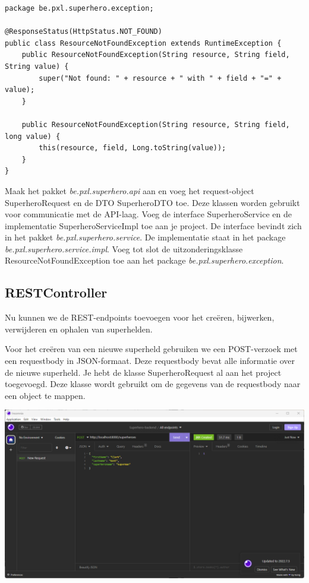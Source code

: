 \begin{lstlisting}
package be.pxl.superhero.exception;

@ResponseStatus(HttpStatus.NOT_FOUND)
public class ResourceNotFoundException extends RuntimeException {
    public ResourceNotFoundException(String resource, String field, String value) {
        super("Not found: " + resource + " with " + field + "=" + value);
    }

    public ResourceNotFoundException(String resource, String field, long value) {
        this(resource, field, Long.toString(value));
    }
}
\end{lstlisting}

\begin{oefening}
Maak het pakket \textit{be.pxl.superhero.api} aan en voeg het request-object SuperheroRequest en de DTO SuperheroDTO toe. Deze klassen worden gebruikt voor communicatie met de API-laag. Voeg de interface SuperheroService en de implementatie SuperheroServiceImpl toe aan je project. De interface bevindt zich in het pakket \textit{be.pxl.superhero.service}. De implementatie staat in het package \textit{be.pxl.superhero.service.impl}. Voeg tot slot de uitzonderingsklasse ResourceNotFoundException toe aan het package \textit{be.pxl.superhero.exception}.
\end{oefening}

\subsection{RESTController}

Nu kunnen we de REST-endpoints toevoegen voor het creëren, bijwerken, verwijderen en ophalen van superhelden.

Voor het creëren van een nieuwe superheld gebruiken we een POST-verzoek met een requestbody in JSON-formaat. Deze requestbody bevat alle informatie over de nieuwe superheld. Je hebt de klasse SuperheroRequest al aan het project toegevoegd. Deze klasse wordt gebruikt om de gegevens van de requestbody naar een object te mappen.

\includegraphics[width=\textwidth]{./images/chapter2/post-request-insomnia.png} 


